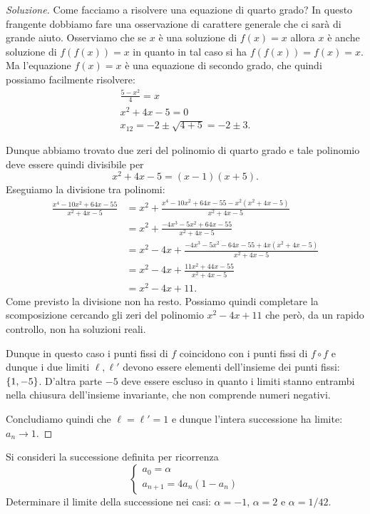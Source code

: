 \begin{proof}[Soluzione]
Come facciamo a risolvere una equazione di quarto grado?
In questo frangente dobbiamo fare una osservazione di carattere
generale che ci sarà di grande aiuto.
Osserviamo che se $x$ è una soluzione di $f(x)=x$ allora $x$
è anche soluzione di $f(f(x)) = x$ in quanto in tal caso si ha
$f(f(x))=f(x)=x$.
Ma l'equazione $f(x) = x$ è una equazione di secondo grado, che quindi
possiamo facilmente risolvere:
\begin{gather*}
  \frac{5-x^2}{4} = x \\
  x^2 + 4x - 5 = 0 \\
  x_{12} = -2 \pm \sqrt{4 + 5} = -2 \pm 3.
\end{gather*}

Dunque abbiamo trovato due zeri del polinomio di quarto grado e
tale polinomio deve essere quindi divisibile per
\[
 x^2 + 4x - 5 = (x-1)(x+5).
\]
Eseguiamo la divisione tra polinomi:
\begin{align*}
\frac{x^4 - 10 x^2 + 64 x - 55}{x^2 + 4x - 5}
&= x^2 + \frac{x^4 - 10 x^2 + 64x - 55 - x^2 (x^2 + 4x - 5)}{x^2+4x-5}\\
&= x^2 + \frac{-4x^3 - 5 x^2 + 64 x - 55}{x^2+4x-5}\\
&= x^2 - 4x + \frac{-4x^3 - 5x^2 - 64 x - 55 + 4x(x^2+4x-5)}{x^2+4x-5}
\\
&= x^2 - 4x + \frac{11 x^2 + 44 x - 55}{x^2 + 4x -5}\\
&= x^2 - 4x + 11.
\end{align*}
Come previsto la divisione non ha resto. Possiamo quindi completare la
scomposizione cercando gli zeri del polinomio $x^2-4x+11$ che però, da
un rapido controllo, non ha soluzioni reali.

Dunque in questo caso i punti fissi di $f$ coincidono con i punti
fissi di $f\circ f$ e dunque i due limiti $\ell, \ell'$ devono essere
elementi dell'insieme dei punti fissi: ${\left\{ 1, -5 \right\}}$. D'altra parte $-5$
deve essere escluso in quanto i limiti stanno entrambi nella chiusura
dell'insieme invariante, che non comprende numeri negativi.

Concludiamo quindi che $\ell = \ell' = 1$ e dunque l'intera
successione ha limite: $a_n \to 1$.
\end{proof}

\begin{exercise}\label{ex_7}
  Si consideri la successione definita per ricorrenza
  \[
  \begin{cases}
    a_0 = \alpha\\
    a_{n+1} = 4 a_n (1-a_n) %
  \end{cases}
  \]
  Determinare il limite della successione nei casi: 
  $\alpha=-1$, 
  $\alpha=2$ e 
  $\alpha=1/42$.
\end{exercise}


